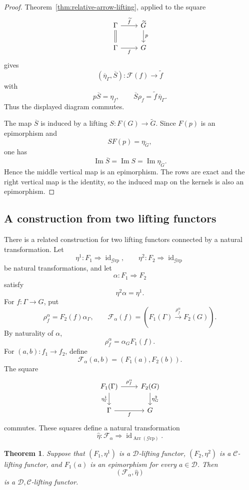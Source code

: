 \documentclass[10pt]{amsart}
\newtheorem{theorem}{Theorem}[section]
\renewcommand{\*}{\cdot {\dots} \cdot}
\newcommand{\?}[1]{\overset{?}{#1}}
\newcommand{\id}{\operatorname{id}}
\newcommand{\Grp}{\mathcal{G}\text{rp}}
\numberwithin{equation}{section}
\begin{document}
\begin{proof}
Theorem~\ref{thm:relative-arrow-lifting}, applied to the square
\[
\begin{tikzcd}
\Gamma \arrow[r,"\widetilde f"] \arrow[d,equal]
& \widetilde G \arrow[d,"p"]\\
\Gamma \arrow[r,"f"']
& G
\end{tikzcd}
\]
gives
\[
(\overline\eta_\Gamma,\overline S)\colon
\mathscr F(f)\longrightarrow\widetilde f
\]
with
\[
p\overline S=\eta_f,
\qquad
\overline S\rho_f
=\widetilde f\,\overline\eta_\Gamma.
\]
Thus the displayed diagram commutes.

The map $\overline S$ is induced by a lifting
$S\colon F(G)\to\widetilde G$. Since $F(p)$ is an epimorphism
and
\[
SF(p)=\eta_{\widetilde G},
\]
one has
\[
\operatorname{Im}\overline S
=\operatorname{Im}S
=\operatorname{Im}\eta_{\widetilde G}.
\]
Hence the middle vertical map is an epimorphism. The rows are
exact and the right vertical map is the identity, so the induced
map on the kernels is also an epimorphism.
\end{proof}

\subsection{A construction from two lifting functors}

There is a related construction for two lifting functors
connected by a natural transformation. Let
\[
\eta^1\colon F_1\Longrightarrow\id_{\Grp},
\qquad
\eta^2\colon F_2\Longrightarrow\id_{\Grp}
\]
be natural transformations, and let
\[
\alpha\colon F_1\Longrightarrow F_2
\]
satisfy
\[
\eta^2\alpha=\eta^1.
\]
For $f\colon\Gamma\to G$, put
\[
\rho_f^\alpha=F_2(f)\alpha_\Gamma, \qquad
\mathscr F_\alpha(f)=
\left(
F_1(\Gamma)\xrightarrow{\rho_f^\alpha}F_2(G)
\right).
\]
By naturality of $\alpha$,
\[
\rho_f^\alpha=\alpha_GF_1(f).
\]
For $(a,b)\colon f_1\to f_2$, define
\[
\mathscr F_\alpha(a,b)=(F_1(a),F_2(b)).
\]
The square
\[
\begin{tikzcd}
F_1(\Gamma)
    \arrow[r,"\rho_f^\alpha"]
    \arrow[d,"\eta^1_\Gamma"']
&
F_2(G)
    \arrow[d,"\eta^2_G"]
\\
\Gamma \arrow[r,"f"']
& G
\end{tikzcd}
\]
commutes. These squares define a natural transformation
\[
\widehat\eta\colon
\mathscr F_\alpha\Longrightarrow\id_{\operatorname{Arr}(\Grp)}.
\]

\begin{theorem}\label{thm:arrow-lifting-natural-transformation}
Suppose that $(F_1,\eta^1)$ is a $\mathcal D$-lifting functor,
$(F_2,\eta^2)$ is a $\mathcal C$-lifting functor, and $F_1(a)$
is an epimorphism for every $a\in\mathcal D$. Then
\[
(\mathscr F_\alpha,\widehat\eta)
\]
is a $\widehat{\mathcal D,\mathcal C}$-lifting functor.
\end{theorem}
\end{document}
